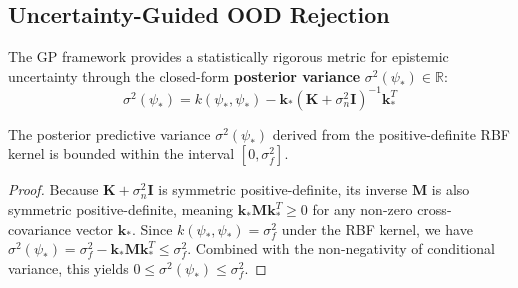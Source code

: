 \subsection{Uncertainty-Guided OOD Rejection}
The GP framework provides a statistically rigorous metric for epistemic uncertainty through the closed-form \textbf{posterior variance} $\sigma^2(\psi_*) \in \mathbb{R}$:
\begin{equation}
\sigma^2(\psi_*) = k(\psi_*, \psi_*) - \mathbf{k}_* \left( \mathbf{K} + \sigma_n^2 \mathbf{I} \right)^{-1} \mathbf{k}_*^T
\label{eq:post_var}
\end{equation}

\begin{proposition}
The posterior predictive variance $\sigma^2(\psi_*)$ derived from the positive-definite RBF kernel is bounded within the interval $[0, \sigma_f^2]$.
\end{proposition}
\begin{proof}
Because $\mathbf{K} + \sigma_n^2 \mathbf{I}$ is symmetric positive-definite, its inverse $\mathbf{M}$ is also symmetric positive-definite, meaning $\mathbf{k}_* \mathbf{M} \mathbf{k}_*^T \ge 0$ for any non-zero cross-covariance vector $\mathbf{k}_*$. Since $k(\psi_*, \psi_*) = \sigma_f^2$ under the RBF kernel, we have $\sigma^2(\psi_*) = \sigma_f^2 - \mathbf{k}_* \mathbf{M} \mathbf{k}_*^T \le \sigma_f^2$. Combined with the non-negativity of conditional variance, this yields $0 \le \sigma^2(\psi_*) \le \sigma_f^2$.
\end{proof}

